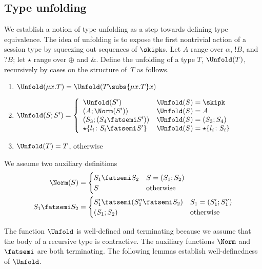 \subsection{Type unfolding}
\label{sec:type-unfolding}

We establish a notion of type unfolding as a step towards
defining type equivalence. The idea of unfolding is to expose the
first nontrivial action of a session type by squeezing out sequences
of $\skipk$s.
Let $A$ range over $\alpha$, $!B$, and $?B$; let $\star$ range over
$\oplus$ and $\&$. 
%
Define the unfolding of a type $T$,  $\Unfold(T)$, recursively by cases on the
structure of~$T$ as follows. 
\begin{enumerate}
\item $\Unfold(\mu x.T) = \Unfold(T\subs{\mu x.T}x)$
\item $\Unfold (S;S') = \left\{%
  \begin{array}{ll}
    \Unfold(S') & \Unfold(S) = \skipk
    \\
    (A; \Norm(S')) & \Unfold(S) = A
    \\
    (S_3; (S_4\fatsemi S')) & \Unfold(S) = (S_3;S_4)
    \\
    \star\{l_i\colon S_i\fatsemi S'\}  & \Unfold (S) = \star\{l_i\colon S_i\}
  \end{array}
  \right.
$
\item $\Unfold(T) = T$, otherwise
\end{enumerate}
We assume two auxiliary definitions
\begin{align*}
  \Norm (S) &=
              \begin{cases}
                S_1 \fatsemi S_2 & S = (S_1; S_2) \\
                S & \text{otherwise}
              \end{cases}
  \\
  S_1 \fatsemi S_2 &=
                     \begin{cases}
                       S_1' \fatsemi (S_1'' \fatsemi S_2) & S_1 =
                       (S_1'; S_1'') \\
                       (S_1; S_2) & \text{otherwise}
                     \end{cases}
\end{align*}

The function $\Unfold$ is well-defined and terminating because we
assume that the body of a recursive type is contractive. The auxiliary
functions $\Norm$ and $\fatsemi$ are both terminating.
The following
lemmas establish well-definedness of $\Unfold$.

